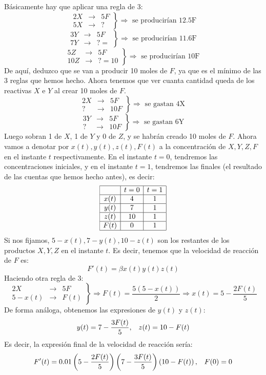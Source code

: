 Básicamente hay que aplicar una regla de 3:
\[
\left.
\begin{array}{ccc}
2X & \longrightarrow & 5F\\
5X & \longrightarrow & ?
\end{array}
\right\} \Rightarrow \text{ se producirían  12.5F}
\]
\[
\left.
\begin{array}{ccc}
3Y & \longrightarrow & 5F\\
7Y & \longrightarrow & ? = 
\end{array}
\right\} \Rightarrow \text{ se producirían  11.6F }
\]
\[
\left.
\begin{array}{ccc}
5Z & \longrightarrow & 5F\\
10Z & \longrightarrow & ? = 10 
\end{array}
\right\} \Rightarrow \text{ se producirían  10F }
\]
De aquí, deduzco que se van a producir 10 moles de $F$, ya que es el mínimo de las 3 reglas que hemos hecho. Ahora tenemos que ver cuanta cantidad queda de los reactivas $X$ e $Y$ al crear 10 moles de $F$.
\[
\left.
\begin{array}{ccc}
2X & \longrightarrow & 5F\\
? & \longrightarrow & 10F
\end{array} 
\right\}
\Rightarrow \text{ se gastan 4X }
\]
\[
\left.
\begin{array}{ccc}
3Y & \longrightarrow & 5F\\
? & \longrightarrow & 10F
\end{array}
\right\} \Rightarrow \text{ se gastan 6Y }
\]
Luego sobran 1 de $X$, 1 de $Y$ y 0 de $Z$, y se habrán creado 10 moles de $F$. Ahora vamos a denotar por $x(t),y(t),z(t),F(t)$ a la concentración de $X,Y,Z,F$ en el instante $t$ respectivamente. En el instante $t=0$, tendremos las concentraciones iniciales, y en el instante $t=1$, tendremos las finales (el resultado de las cuentas que hemos hecho antes), es decir:
\[
\begin{array}{|c|c|c|}
\hline
& t=0 & t=1 \\
\hline
x(t) & 4 & 1\\
\hline
y(t) & 7 & 1\\
\hline
z(t) & 10 & 1\\
\hline
F(t) & 0 & 1\\
\hline
\end{array}
\]
Si nos fijamos, $5-x(t),7-y(t),10-z(t)$ son los restantes de los productos $X,Y,Z$ en el instante $t$. Es decir, tenemos que la velocidad de reacción de $F$ es:
\[
F'(t)=\beta x(t)y(t)z(t)
\]
Haciendo otra regla de 3:
\[
\left.
\begin{array}{ccc}
2X & \longrightarrow & 5F\\
5-x(t) & \longrightarrow & F(t)
\end{array}
\right\} \Rightarrow F(t)=\frac{5(5-x(t))}{2} \Rightarrow x(t)=5-\frac{2F(t)}{5}
\]
De forma análoga, obtenemos las expresiones de $y(t)$ y $z(t)$:
\[
y(t)=7-\frac{3F(t)}{5}, \;\;\; z(t)=10-F(t)
\]
Es decir, la expresión final de la velocidad de reacción sería:
\[
F'(t)=0.01\left(5-\frac{2F(t)}{5}\right)\left(7-\frac{3F(t)}{5}\right)\left(10-F(t)\right), \;\;\; F(0)=0
\]

